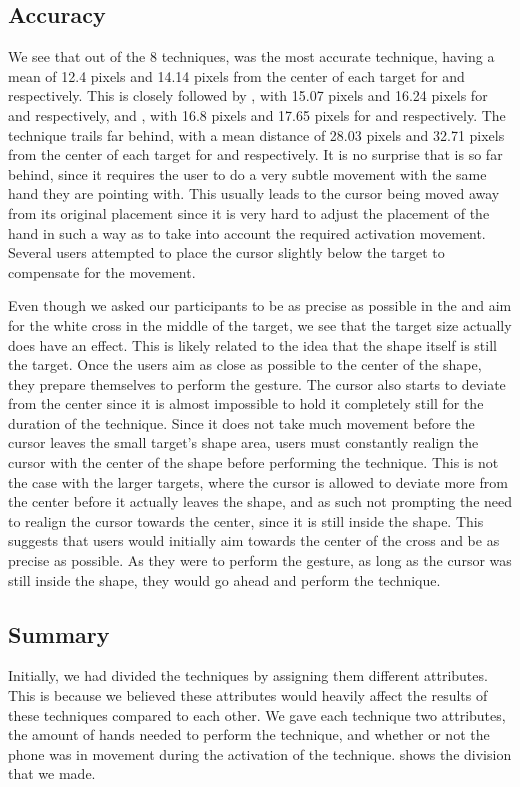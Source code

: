 \subsection{Accuracy}
\label{sec:accuracy}
We see that out of the 8 techniques, \swipe was the most accurate technique, having a mean of 12.4 pixels and 14.14 pixels from the center of each target for \pull and \push respectively. 
This is closely followed by \throw, with 15.07 pixels and 16.24 pixels for \pull and \push respectively, and \grab, with 16.8 pixels and 17.65 pixels for \push and \pull respectively.
The \tilt technique trails far behind, with a mean distance of 28.03 pixels and 32.71 pixels from the center of each target for \push and \pull respectively.   
It is no surprise that \tilt is so far behind, since it requires the user to do a very subtle movement with the same hand they are pointing with.
This usually leads to the cursor being moved away from its original placement since it is very hard to adjust the placement of the hand in such a way as to take into account the required activation movement. 
Several users attempted to place the cursor slightly below the target to compensate for the movement. 

Even though we asked our participants to be as precise as possible in the \accuracy and aim for the white cross in the middle of the target, we see that the target size actually does have an effect.
This is likely related to the idea that the shape itself is still the target. 
Once the users aim as close as possible to the center of the shape, they prepare themselves to perform the gesture. 
The cursor also starts to deviate from the center since it is almost impossible to hold it completely still for the duration of the technique.
Since it does not take much movement before the cursor leaves the small target's shape area, users must constantly realign the cursor with the center of the shape before performing the technique.
This is not the case with the larger targets, where the cursor is allowed to deviate more from the center before it actually leaves the shape, and as such not prompting the need to realign the cursor towards the center, since it is still inside the shape. 
This suggests that users would initially aim towards the center of the cross and be as precise as possible. 
As they were to perform the gesture, as long as the cursor was still inside the shape, they would go ahead and perform the technique.

\subsection{Summary}
Initially, we had divided the techniques by assigning them different attributes. 
This is because we believed these attributes would heavily affect the results of these techniques compared to each other.
We gave each technique two attributes, the amount of hands needed to perform the technique, and whether or not the phone was in movement during the activation of the technique.
 shows the division that we made.

